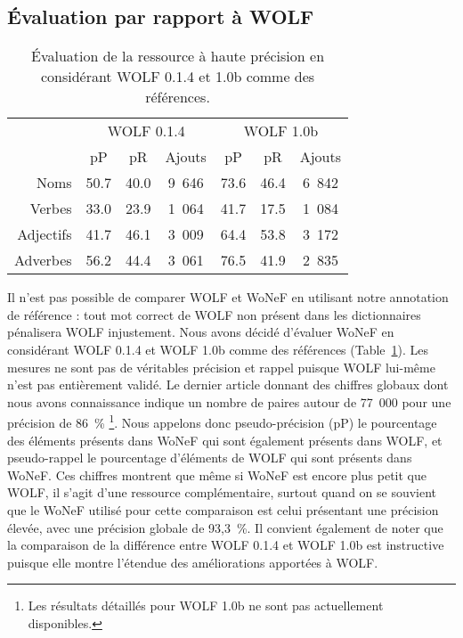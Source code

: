 \subsection{Évaluation par rapport à WOLF}
\label{subsec:vswolf}

\begin{table}[ht]
\centering
\begin{tabular}{rccc|ccc}
  \toprule
             & \multicolumn{3}{c}{WOLF 0.1.4}    & \multicolumn{3}{c}{WOLF 1.0b} \\
             &   pP      &    pR     & Ajouts    &     pP    &    pR    & Ajouts \\
  Noms       & 50.7     & 40.0     & 9~646     & 73.6     & 46.4    & 6~842  \\
  Verbes     & 33.0     & 23.9     & 1~064     & 41.7     & 17.5    & 1~084  \\
  Adjectifs  & 41.7     & 46.1     & 3~009     & 64.4     & 53.8    & 3~172  \\
  Adverbes   & 56.2     & 44.4     & 3~061     & 76.5     & 41.9    & 2~835  \\ 
  \bottomrule
\end{tabular}
\caption{\label{table:wolfcomparison}Évaluation de la ressource à haute précision en considérant WOLF 0.1.4 et 1.0b comme des références.}
\end{table}

Il n'est pas possible de comparer WOLF et WoNeF en utilisant notre annotation
de référence : tout mot correct de WOLF non présent dans les dictionnaires
pénalisera WOLF injustement. Nous avons décidé d'évaluer WoNeF en considérant
WOLF 0.1.4 et WOLF 1.0b comme des références
(Table~\ref{table:wolfcomparison}). Les mesures ne sont pas de véritables
précision et rappel puisque WOLF lui-même n'est pas entièrement validé. Le
dernier article donnant des chiffres globaux \citep{sagot2012automatic} dont
nous avons connaissance indique un nombre de paires autour de 77~000 pour une
précision de 86~\% \footnote{Les résultats détaillés pour WOLF 1.0b ne sont pas
actuellement disponibles.}. Nous appelons donc pseudo-précision (pP) le
pourcentage des éléments présents dans WoNeF qui sont également présents dans
WOLF, et pseudo-rappel le pourcentage d'éléments de WOLF qui sont présents dans
WoNeF.  Ces chiffres montrent que même si WoNeF est encore plus petit que WOLF,
il s'agit d'une ressource complémentaire, surtout quand on se souvient que le
WoNeF utilisé pour cette comparaison est celui présentant une précision élevée,
avec une précision globale de 93,3~\%. Il convient également de noter que la
comparaison de la différence entre WOLF 0.1.4 et WOLF 1.0b est instructive
puisque elle montre l'étendue des améliorations apportées à WOLF.

